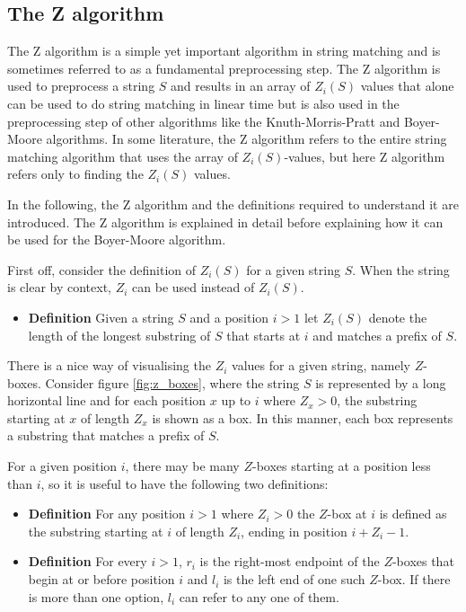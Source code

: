 \subsection{The Z algorithm}
The Z algorithm is a simple yet important algorithm in string matching and is sometimes referred to as a fundamental preprocessing step\cite{Gusfield1997AlgorithmsOS}. The Z algorithm is used to preprocess a string $S$ and results in an array of $Z_i(S)$ values that alone can be used to do string matching in linear time but is also used in the preprocessing step of other algorithms like the Knuth-Morris-Pratt and Boyer-Moore algorithms. In some literature, the Z algorithm refers to the entire string matching algorithm that uses the array of $Z_i(S)$-values, but here Z algorithm refers only to finding the $Z_i(S)$ values. 

In the following, the Z algorithm and the definitions required to understand it are introduced. The Z algorithm is explained in detail before explaining how it can be used for the Boyer-Moore algorithm. 

First off, consider the definition of $Z_i(S)$ for a given string $S$. When the string is clear by context, $Z_i$ can be used instead of $Z_i(S)$. 

\begin{itemize}
    \item[] \textbf{Definition} Given a string $S$ and a position $i>1$ let $Z_i(S)$ denote the length of the longest substring of $S$ that starts at $i$ and matches a prefix of $S$. 
\end{itemize}

 There is a nice way of visualising the $Z_i$ values for a given string, namely $Z$-boxes. Consider figure \ref{fig:z_boxes}, where the string $S$ is represented by a long horizontal line and for each position $x$ up to $i$ where $Z_x>0$, the substring starting at $x$ of length $Z_x$ is shown as a box. In this manner, each box represents a substring that matches a prefix of $S$. 

For a given position $i$, there may be many $Z$-boxes starting at a position less than $i$, so it is useful to have the following two definitions:

\begin{itemize}
    \item[] \textbf{Definition} For any position $i>1$ where $Z_i>0$ the $Z$-box at $i$ is defined as the substring starting at $i$ of length $Z_i$, ending in position $i+Z_i-1$. 
    \item[] \textbf{Definition} For every $i>1$, $r_i$ is the right-most endpoint of the $Z$-boxes that begin at or before position $i$ and $l_i$ is the left end of one such $Z$-box. If there is more than one option, $l_i$ can refer to any one of them. 
\end{itemize}


